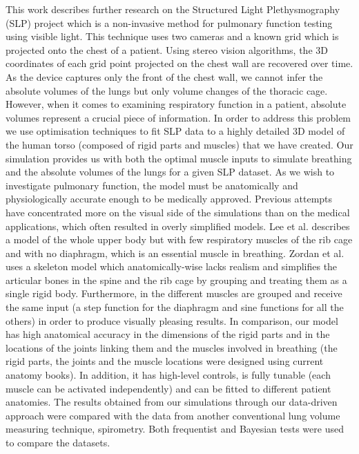 \begin{titlepage}
 
This work describes further research on the Structured Light Plethysmography (SLP) project \cite{slp2010} which is a non-invasive method for pulmonary function testing using visible light. This technique uses two cameras and a known grid which is projected onto the chest of a patient. Using stereo vision algorithms, the 3D coordinates of each grid point projected on the chest wall are recovered over time. As the device captures only the front of the chest wall, we cannot infer the absolute volumes of the lungs but only volume changes of the thoracic cage. However, when it comes to examining respiratory function in a patient, absolute volumes represent a crucial piece of information. In order to address this problem we use optimisation techniques to fit SLP data to a highly detailed 3D model of the human torso (composed of rigid parts and muscles) that we have created. Our simulation provides us with both the optimal muscle inputs to simulate breathing and the absolute volumes of the lungs for a given SLP dataset.
As we wish to investigate pulmonary function, the model must be anatomically and physiologically accurate enough to be medically approved. Previous attempts have concentrated more on the visual side of the simulations than on the medical applications, which often resulted in overly simplified models. Lee et al. \cite{lee2009comprehensive} describes a model of the whole upper body but with few respiratory muscles of the rib cage and with no diaphragm, which is an essential muscle in breathing. Zordan et al. \cite{zordan2004breathe} uses a skeleton model which anatomically-wise lacks realism and simplifies the articular bones in the spine and the rib cage by grouping and treating them as a single rigid body. Furthermore, in \cite{zordan2004breathe} the different muscles are grouped and receive the same input (a step function for the diaphragm and sine functions for all the others) in order to produce visually pleasing results.
In comparison, our model has high anatomical accuracy in the dimensions of the rigid parts and in the locations of the joints linking them and the muscles involved in breathing (the rigid parts, the joints and the muscle locations were designed using current anatomy books). In addition, it has high-level controls, is fully tunable (each muscle can be activated independently) and can be fitted to different patient anatomies.
The results obtained from our simulations through our data-driven approach were compared with the data from another conventional lung volume measuring technique, spirometry. Both frequentist and Bayesian tests were used to compare the datasets.
\end{titlepage}